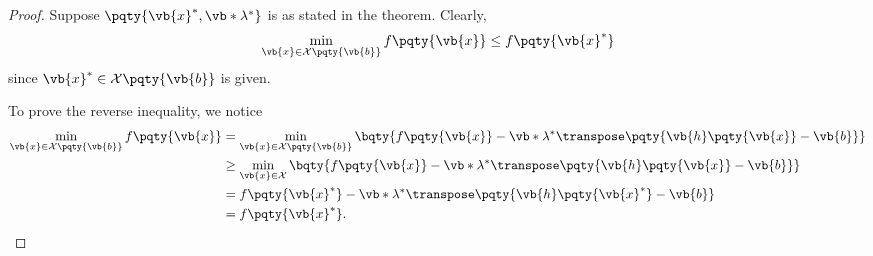 \begin{proof}
    Suppose \(\pqty{\vb{x}^{\ast}, \vb*{\lambda}^{\ast}}\) is as stated in the theorem. Clearly,
    \[
        \min_{\vb{x} \in \mathcal{X} \pqty{\vb{b}}} f\pqty{\vb{x}} \leq f\pqty{\vb{x}^{\ast}}
    \]
    since \(\vb{x}^{\ast} \in \mathcal{X} \pqty{\vb{b}}\) is given.
    
    To prove the reverse inequality, we notice
    \begin{align*}
        \min_{\vb{x} \in \mathcal{X} \pqty{\vb{b}}} f\pqty{\vb{x}} &= \min_{\vb{x} \in \mathcal{X} \pqty{\vb{b}}} \bqty{f\pqty{\vb{x}} - {\vb*{\lambda}^{\ast}}\transpose \pqty{\vb{h} \pqty{\vb{x}} - \vb{b}}} \\
        &\geq \min_{\vb{x} \in \mathcal{X}} \bqty{f\pqty{\vb{x}} - {\vb*{\lambda}^{\ast}}\transpose \pqty{\vb{h} \pqty{\vb{x}} - \vb{b}}} \\
        &= f\pqty{\vb{x}^{\ast}} - {\vb*{\lambda}^{\ast}}\transpose \pqty{\vb{h} \pqty{\vb{x}^{\ast}} - \vb{b}} \\
        &= f\pqty{\vb{x}^{\ast}}.
    \end{align*}
\end{proof}

